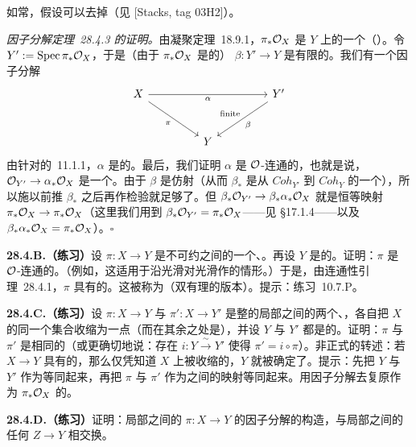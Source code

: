 如常，\trNoether{}假设可以去掉（见 [Stacks, tag 03H2]）。

\emph{\mbox{\trStein{}因子分解定理~28.4.3} 的证明。}\quad 由\mbox{\trGrothendieck{}凝聚定理~18.9.1}，$\pi_*\mathcal{O}_X$ 是 $Y$ 上的一个\trCoherentSheaf（\trSheafOfAlgebras）。令 $Y':=\operatorname{Spec}\pi_*\mathcal{O}_X$，于是（由于 $\pi_*\mathcal{O}_X$ 是\trFiniteType{}的）\trStructureMorphism{} $\beta\colon Y'\to Y$ 是有限的。我们有一个因子分解
\[
\begin{tikzcd}[row sep=2.8em, column sep=4.5em]
X \ar[rr, "\alpha"'] \ar[dr, "\pi"'] && {Y'} \ar[dl, "\beta", "\text{finite}"'] \\
& Y &
\end{tikzcd}
\]
由针对\trProper\trMorphism{}的\mbox{\trCancellationTheorem~11.1.1}，$\alpha$ 是\trProper{}的。最后，我们证明 $\alpha$ 是 $\mathcal{O}$-连通的，也就是说，$\mathcal{O}_{Y'}\to\alpha_*\mathcal{O}_X$ 是一个\trIsomorphism。由于 $\beta$ 是仿射\trMorphism（从而 $\beta_*$ 是从 $\mathit{Coh}_{Y'}$ 到 $\mathit{Coh}_Y$ 的一个\trExact\trFunctor），所以施以前推 $\beta_*$ 之后再作检验就足够了。但 $\beta_*\mathcal{O}_{Y'}\to\beta_*\alpha_*\mathcal{O}_X$ 就是恒等映射 $\pi_*\mathcal{O}_X\to\pi_*\mathcal{O}_X$（这里我们用到 $\beta_*\mathcal{O}_{Y'}=\pi_*\mathcal{O}_X$——见 \S17.1.4——以及 $\beta_*\alpha_*\mathcal{O}_X=\pi_*\mathcal{O}_X$）。\hfill$\square$

\textbf{28.4.B.（练习）}\quad 设 $\pi\colon X\to Y$ 是不可约\trVariety{}之间的一个\trProper{}、\trBirational{}\trMorphism。再设 $Y$ 是\trNormal{}的。证明：$\pi$ 是 $\mathcal{O}$-连通的。（例如，这适用于沿光滑\trCenter{}对光滑\trVariety{}作\trBlowup{}的情形。）于是，由\mbox{\trZariski{}连通性引理~28.4.1}，$\pi$ 具有\trConnected{}的\trFiber。这被称为\mbox{\trZariskiMainTheorem}（双有理\trMorphism{}的版本）。提示：\mbox{练习~10.7.P}。

\textbf{28.4.C.（练习）}\quad 设 $\pi\colon X\to Y$ 与 $\pi'\colon X\to Y'$ 是整的局部\trNoether{}\trScheme{}之间的两个\trProper{}、\trBirational{}\trMorphism，各自把 $X$ 的同一个\trConnected{}集合收缩为一点（而在其余之处是\trIsomorphism），并设 $Y$ 与 $Y'$ 都是\trNormal{}的。证明：$\pi$ 与 $\pi'$ 是相同的\trMorphism（或更确切地说：存在\trIsomorphism{} $i\colon Y\xrightarrow{\ \sim\ }Y'$ 使得 $\pi'=i\circ\pi$）。非正式的转述：若 $X\to Y$ 具有\trConnected{}的\trFiber，那么仅凭知道 $X$ 上被收缩的\trLocus，$Y$ 就被确定了。提示：先把 $Y$ 与 $Y'$ 作为\trTopologicalSpace{}等同起来，再把 $\pi$ 与 $\pi'$ 作为\trTopologicalSpace{}之间的映射等同起来。用\trStein{}因子分解去复原作为 $\pi_*\mathcal{O}_X$ 的\trStructureSheaf。

\textbf{28.4.D.（练习）}\quad 证明：局部\trNoether{}\trScheme{}之间的\trMorphism{} $\pi\colon X\to Y$ 的\trStein{}因子分解的构造，与局部\trNoether{}\trScheme{}之间的任何\trFlat\trBaseChange{} $Z\to Y$ 相交换。

